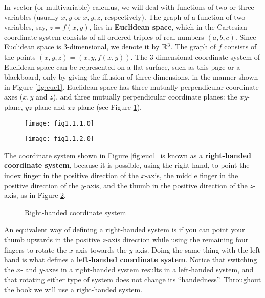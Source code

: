 In vector (or multivariable) calculus, we will deal with functions of two or three variables (usually $x, y$ or
$x, y, z$, respectively).  The graph of a function of two variables, say, $z = f(x,y)$, lies in
\textbf{Euclidean space}, which in the Cartesian coordinate system consists of all ordered
triples of real numbers $(a, b, c)$.  Since Euclidean space is 3-dimensional, we denote it by
$\mathbb{R}^{3}$.  The graph of $f$ consists
of the points $(x, y, z) = (x, y, f(x, y))$.  The 3-dimensional coordinate system of Euclidean space can be
represented on a flat surface, such as this page or a blackboard, only by giving the illusion of three
dimensions, in the manner shown in Figure \ref{fig:euc1}.  Euclidean space has three mutually perpendicular
coordinate axes ($x, y$ and $z$), and three mutually perpendicular coordinate planes:
the $xy$-plane, $yz$-plane and $xz$-plane (see Figure \ref{fig:euc2}).
\newline
\begin{figure}[h]
\begin{minipage}[t]{7.5cm}
 \begin{center}
  \texttt{[image: fig1.1.1.0]}
 \end{center}
 \caption[]{}
 \label{fig:euc1}
\end{minipage}
\begin{minipage}[t]{7.5cm}
 \begin{center}
  \texttt{[image: fig1.1.2.0]}
 \end{center}
 \caption[]{}
 \label{fig:euc2}
\end{minipage}
\end{figure}
\newpage
The coordinate system shown in Figure \ref{fig:euc1} is known as a
\textbf{right-handed coordinate system}, because
it is possible, using the right hand, to point the index finger in the positive direction of the $x$-axis,
the middle finger in the positive direction of the $y$-axis, and the thumb in the positive direction of the
$z$-axis, as in Figure \ref{fig:rhs}.

\begin{figure}[h]
 \begin{center}
  
 \end{center}
 \caption[]{\quad Right-handed coordinate system}
 \label{fig:rhs}
\end{figure}

An equivalent way of defining a right-handed system is if you can point your thumb upwards in the positive
$z$-axis direction while using the remaining four fingers to rotate the $x$-axis towards the $y$-axis.
Doing the same thing
with the left hand is what defines a \textbf{left-handed coordinate system}.
Notice that switching the $x$- and $y$-axes
in a right-handed system results in a left-handed system, and that rotating either type of system does not change its
``handedness''.  Throughout the book we will use a right-handed system.


